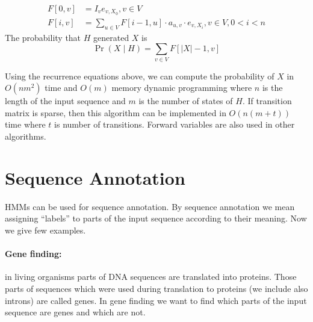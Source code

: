 \begin{align}
F[0,v] &= I_ve_{v,X_0}, v\in V\\
F[i,v] &= \sum_{u\in V}F[i-1,u] \cdot a_{u,v} \cdot e_{v,X_i}, v\in V,0< i < n
\end{align}
The probability that $H$ generated $X$ is 
 \[\Pr\left(X\mid H\right) = \sum_{v\in V} F[|X|-1,v]\]

Using the recurrence equations above, we can compute the probability of $X$ in
$O(nm^2)$ time and $O(m)$ memory dynamic programming where $n$ is the length
of the input sequence and $m$ is the number of states of $H$. If transition
matrix is sparse, then this algorithm can be implemented in $O(n(m+t))$ time
where $t$ is number of transitions.  Forward variables are also used in other
algorithms. 

\section{Sequence Annotation}


HMMs can be used for sequence annotation. By sequence annotation we mean
assigning ``labels'' to parts of the input sequence according to their meaning.
Now we give few examples.

\paragraph{Gene finding:} in living organisms parts of DNA sequences are
translated into proteins. Those parts of sequences which were used during
translation to proteins (we include also introns) are called genes. In gene
finding we want to find which parts of the input sequence are genes and which
are not. 


